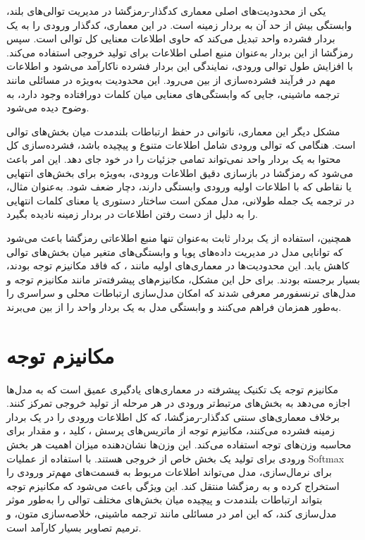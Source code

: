 یکی از محدودیت‌های اصلی معماری کدگذار-رمزگشا  در مدیریت توالی‌های بلند، وابستگی بیش از حد آن به بردار زمینه  است. در این معماری، کدگذار ورودی را به یک بردار فشرده واحد تبدیل می‌کند که حاوی اطلاعات معنایی کل توالی است. سپس رمزگشا از این بردار به‌عنوان منبع اصلی اطلاعات برای تولید خروجی استفاده می‌کند. با افزایش طول توالی ورودی، نمایندگی این بردار فشرده ناکارآمد می‌شود و اطلاعات مهم در فرآیند فشرده‌سازی از بین می‌رود. این محدودیت به‌ویژه در مسائلی مانند ترجمه ماشینی، جایی که وابستگی‌های معنایی میان کلمات دورافتاده وجود دارد، به وضوح دیده می‌شود.

مشکل دیگر این معماری، ناتوانی در حفظ ارتباطات بلندمدت میان بخش‌های توالی است. هنگامی که توالی ورودی شامل اطلاعات متنوع و پیچیده باشد، فشرده‌سازی کل محتوا به یک بردار واحد نمی‌تواند تمامی جزئیات را در خود جای دهد. این امر باعث می‌شود که رمزگشا در بازسازی دقیق اطلاعات ورودی، به‌ویژه برای بخش‌های انتهایی یا نقاطی که با اطلاعات اولیه ورودی وابستگی دارند، دچار ضعف شود. به‌عنوان مثال، در ترجمه یک جمله طولانی، مدل ممکن است ساختار دستوری یا معنای کلمات انتهایی را به دلیل از دست رفتن اطلاعات در بردار زمینه نادیده بگیرد.

همچنین، استفاده از یک بردار ثابت به‌عنوان تنها منبع اطلاعاتی رمزگشا باعث می‌شود که توانایی مدل در مدیریت داده‌های پویا و وابستگی‌های متغیر میان بخش‌های توالی کاهش یابد. این محدودیت‌ها در معماری‌های اولیه مانند ، که فاقد مکانیزم توجه بودند، بسیار برجسته بودند. برای حل این مشکل، مکانیزم‌های پیشرفته‌تر مانند مکانیزم توجه و مدل‌های ترنسفورمر معرفی شدند که امکان مدل‌سازی ارتباطات محلی و سراسری را به‌طور همزمان فراهم می‌کنند و وابستگی مدل به یک بردار واحد را از بین می‌برند.

\section{مکانیزم توجه}
مکانیزم توجه%
\cite{bahdanauNeuralMachineTranslation2016} یک تکنیک پیشرفته در معماری‌های یادگیری عمیق است که به مدل‌ها اجازه می‌دهد به بخش‌های مرتبط‌تر ورودی در هر مرحله از تولید خروجی تمرکز کنند. برخلاف معماری‌های سنتی کدگذار-رمزگشا، که کل اطلاعات ورودی را در یک بردار زمینه فشرده می‌کنند، مکانیزم توجه از ماتریس‌های پرسش 
،
 کلید 
 ،
  و مقدار   برای محاسبه وزن‌های توجه استفاده می‌کند. این وزن‌ها نشان‌دهنده میزان اهمیت هر بخش ورودی برای تولید یک بخش خاص از خروجی هستند. با استفاده از عملیات Softmax برای نرمال‌سازی، مدل می‌تواند اطلاعات مربوط به قسمت‌های مهم‌تر ورودی را استخراج کرده و به رمزگشا منتقل کند. این ویژگی باعث می‌شود که مکانیزم توجه بتواند ارتباطات بلندمدت و پیچیده میان بخش‌های مختلف توالی را به‌طور موثر مدل‌سازی کند، که این امر در مسائلی مانند ترجمه ماشینی، خلاصه‌سازی متون، و ترمیم تصاویر بسیار کارآمد است.
  
